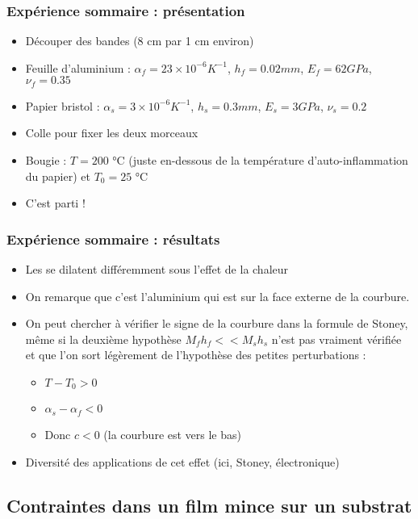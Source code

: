 
\begin{frame}
\frametitle{Expérience sommaire : présentation}
\begin{itemize}
    \item Découper des bandes (8 cm par 1 cm environ)
    \item Feuille d'aluminium : $\alpha_f = 23 \times 10^{-6} K^{-1}$, $h_f = 0.02 mm$, $E_f = 62 GPa$, $\nu_f = 0.35$
    \item Papier bristol : $\alpha_s = 3 \times 10^{-6} K^{-1}$, $h_s = 0.3 mm$, $E_s = 3 GPa$, $\nu_s = 0.2$
    \item Colle pour fixer les deux morceaux
    \item Bougie : $T = 200$ °C (juste en-dessous de la température d'auto-inflammation du papier) et $T_0 = 25$ °C
    \item C'est parti !
\end{itemize}
\end{frame}


\begin{frame}
\frametitle{Expérience sommaire : résultats}
    \begin{itemize}
        \item Les se dilatent différemment sous l'effet de la chaleur
        \item On remarque que c'est l'aluminium qui est sur la face externe de la courbure. 
        \item On peut chercher à vérifier le signe de la courbure dans la formule de Stoney, même si la deuxième hypothèse $M_f h_f << M_s h_s$ n'est pas vraiment vérifiée et que l'on sort légèrement de l'hypothèse des petites perturbations :
        \begin{itemize}    
            \item $T-T_0 > 0$
            \item $\alpha_s - \alpha_f < 0$
            \item Donc $c < 0$ (la courbure est vers le bas)
        \end{itemize}
        \item Diversité des applications de cet effet (ici, Stoney, électronique)
    \end{itemize}
\end{frame}



\subsection{Contraintes dans un film mince sur un substrat} %

